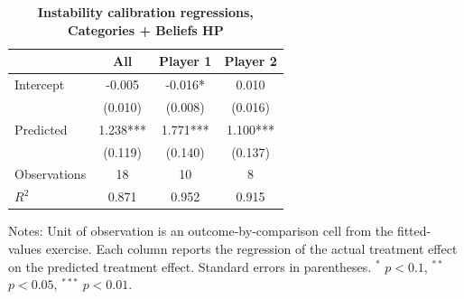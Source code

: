 \begin{table}[!htbp]
\centering
\caption{\textbf{Instability calibration regressions, Categories + Beliefs HP}}
\label{tab:cats_hp_instability_regs}
\begin{tabular}{lccc}
\toprule
& All & Player 1 & Player 2 \\
\midrule
Intercept & -0.005 & -0.016* & 0.010 \\
& (0.010) & (0.008) & (0.016) \\
Predicted & 1.238*** & 1.771*** & 1.100*** \\
& (0.119) & (0.140) & (0.137) \\
Observations & 18 & 10 & 8 \\
$R^2$ & 0.871 & 0.952 & 0.915 \\
\bottomrule
\end{tabular}

\vspace{0.2cm}
\begin{minipage}{0.9\textwidth}
\footnotesize Notes: Unit of observation is an outcome-by-comparison cell from the fitted-values exercise. Each column reports the regression of the actual treatment effect on the predicted treatment effect. Standard errors in parentheses. $^*$ $p<0.1$, $^{**}$ $p<0.05$, $^{***}$ $p<0.01$.
\end{minipage}
\end{table}
